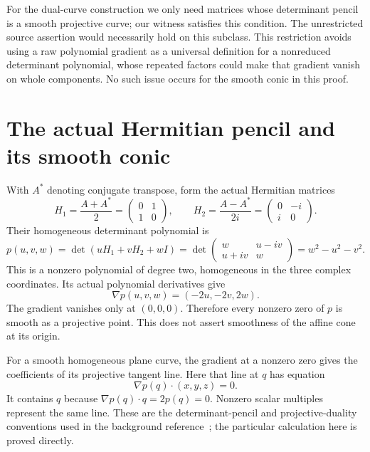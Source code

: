 \documentclass[10pt,letterpaper]{article}
\begin{document}
For the dual-curve construction we only need matrices whose determinant pencil is a smooth projective curve; our witness satisfies this condition. The unrestricted source assertion would necessarily hold on this subclass. This restriction avoids using a raw polynomial gradient as a universal definition for a nonreduced determinant polynomial, whose repeated factors could make that gradient vanish on whole components. No such issue occurs for the smooth conic in this proof.

\section{The actual Hermitian pencil and its smooth conic}
With $A^*$ denoting conjugate transpose, form the actual Hermitian matrices
\[
H_1=\frac{A+A^*}{2}=\begin{pmatrix}0&1\\1&0\end{pmatrix},\qquad
H_2=\frac{A-A^*}{2i}=\begin{pmatrix}0&-i\\i&0\end{pmatrix}.
\]
Their homogeneous determinant polynomial is
\begin{equation}\label{eq:p}
p(u,v,w)=\det(uH_1+vH_2+wI)
=\det\begin{pmatrix}w&u-iv\\u+iv&w\end{pmatrix}
=w^2-u^2-v^2.
\end{equation}
This is a nonzero polynomial of degree two, homogeneous in the three complex coordinates. Its actual polynomial derivatives give
\begin{equation}\label{eq:gradient}
\nabla p(u,v,w)=(-2u,-2v,2w).
\end{equation}
The gradient vanishes only at $(0,0,0)$. Therefore every nonzero zero of $p$ is smooth as a projective point. This does not assert smoothness of the affine cone at its origin.

For a smooth homogeneous plane curve, the gradient at a nonzero zero gives the coefficients of its projective tangent line. Here that line at $q$ has equation
\[
\nabla p(q)\mathbin{\cdot}(x,y,z)=0.
\]
It contains $q$ because $\nabla p(q)\cdot q=2p(q)=0$. Nonzero scalar multiples represent the same line. These are the determinant-pencil and projective-duality conventions used in the background reference~\cite{PRW}; the particular calculation here is proved directly.
\end{document}
